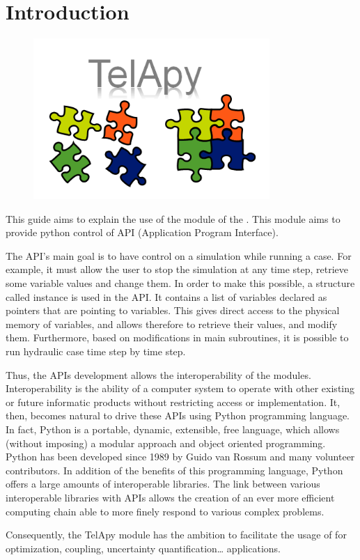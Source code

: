\chapter{Introduction}
\label{ch:intro}

\begin{figure}[H]%
\begin{center}
%
  \includegraphics[width=0.8\textwidth]{./Figures/TelApy.png}
%
\end{center}
\label{fig:telApy}
\end{figure}

This guide aims to explain the use of the \TelApy{} module
of the \telemacsystem. This module aims to provide python control of \tel{} API
(Application Program Interface).

The API’s main goal is to have control on a simulation while running a case.
For example, it must allow the user to stop the simulation at any time step,
retrieve some variable values and change them. In order to make this possible,
a \fortran{} structure called instance is used in the API\@. It contains a
list of variables declared as pointers that are pointing to variables.
This gives direct access to the physical memory of variables, and allows
therefore to retrieve their values, and modify them. Furthermore, based on modifications
in \tel{} main subroutines, it is possible to run hydraulic case time step by time step.

Thus, the APIs development allows the interoperability of the \telemacsystem{}
modules. Interoperability is the ability of a computer system to operate with
other existing or future informatic products without restricting access or
implementation.
It, then, becomes natural to drive these APIs using Python programming
language. In fact, Python is a portable, dynamic, extensible, free language,
which allows (without imposing) a modular approach and object oriented
programming. Python has been developed since 1989 by Guido van Rossum and many
volunteer contributors. In addition of the benefits of this programming
language, Python offers a large amounts of interoperable libraries. The link
between various interoperable libraries with \telemacsystem{} APIs allows the
creation of an ever more efficient computing chain able to more finely respond
to various complex problems.

Consequently, the TelApy module has the ambition to facilitate the usage of
\telemacsystem{} for optimization, coupling, uncertainty quantification\ldots
applications.
